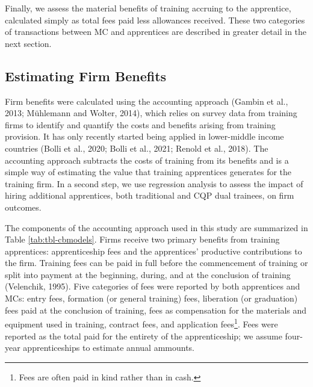 \documentclass[
  11pt,
a4paper
]{article}
\begin{document}
Finally, we assess the material benefits of training accruing to the apprentice, calculated simply as total fees paid less allowances received. These two categories of transactions between MC and apprentices are described in greater detail in the next section.

\hypertarget{firmmethod}{%
\subsection{Estimating Firm Benefits}\label{firmmethod}}



Firm benefits were calculated using the accounting approach (Gambin et al., 2013; Mühlemann and Wolter, 2014), which relies on survey data from training firms to identify and quantify the costs and benefits arising from training provision. It has only recently started being applied in lower-middle income countries (Bolli et al., 2020; Bolli et al., 2021; Renold et al., 2018). The accounting approach subtracts the costs of training from its benefits and is a simple way of estimating the value that training apprentices generates for the training firm. In a second step, we use regression analysis to assess the impact of hiring additional apprentices, both traditional and CQP dual trainees, on firm outcomes.

The components of the accounting approach used in this study are summarized in Table \ref{tab:tbl-cbmodels}. Firms receive two primary benefits from training apprentices: apprenticeship fees and the apprentices' productive contributions to the firm. Training fees can be paid in full before the commencement of training or split into payment at the beginning, during, and at the conclusion of training (Velenchik, 1995). Five categories of fees were reported by both apprentices and MCs: entry fees, formation (or general training) fees, liberation (or graduation) fees paid at the conclusion of training, fees as compensation for the materials and equipment used in training, contract fees, and application fees\footnote{Fees are often paid in kind rather than in cash.}. Fees were reported as the total paid for the entirety of the apprenticeship; we assume four-year apprenticeships to estimate annual ammounts.
\end{document}

